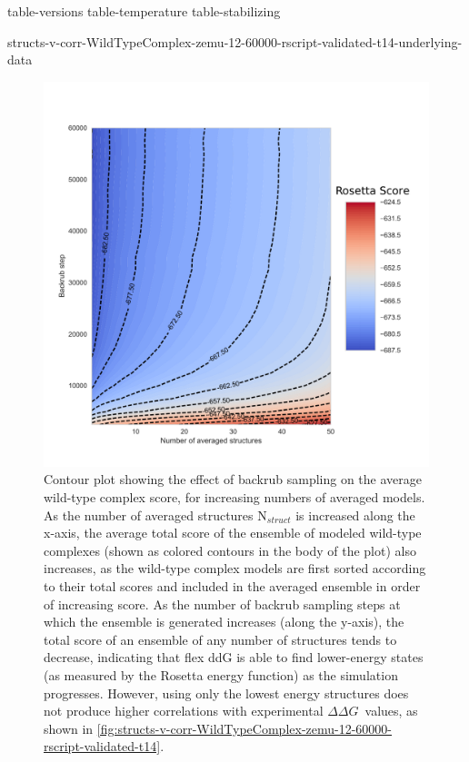 \documentclass{article}
\newcommand\ddg{$\Delta\Delta G$}
\begin{document}
\renewcommand{\thefigure}{S\arabic{figure}}
\setcounter{figure}{0}
\renewcommand{\thetable}{S\arabic{table}}
\setcounter{table}{0}

{table-versions}
{table-temperature}
{table-stabilizing}
\clearpage

\clearpage

\begin{landscape}
{structs-v-corr-WildTypeComplex-zemu-12-60000-rscript-validated-t14-underlying-data}
\end{landscape}
\clearpage

\begin{figure}
  \centering
  \includegraphics[width=\textwidth,keepaspectratio]{figures/wildtypecomplex-scores-complete.pdf}
  \caption{
    Contour plot showing the effect of backrub sampling on the average wild-type complex score, for increasing numbers of averaged models. As the number of averaged structures N$_{struct}$ is increased along the x-axis, the average total score of the ensemble of modeled wild-type complexes (shown as colored contours in the body of the plot) also increases, as the wild-type complex models are first sorted according to their total scores and included in the averaged ensemble in order of increasing score.
    As the number of backrub sampling steps at which the ensemble is generated increases (along the y-axis), the total score of an ensemble of any number of structures tends to decrease, indicating that flex ddG is able to find lower-energy states (as measured by the Rosetta energy function) as the simulation progresses. However, using only the lowest energy structures does not produce higher correlations with experimental \ddg\ values, as shown in \cref{fig:structs-v-corr-WildTypeComplex-zemu-12-60000-rscript-validated-t14}.
  } \label{fig:wildtypecomplex-scores-complete}
\end{figure}
\end{document}
